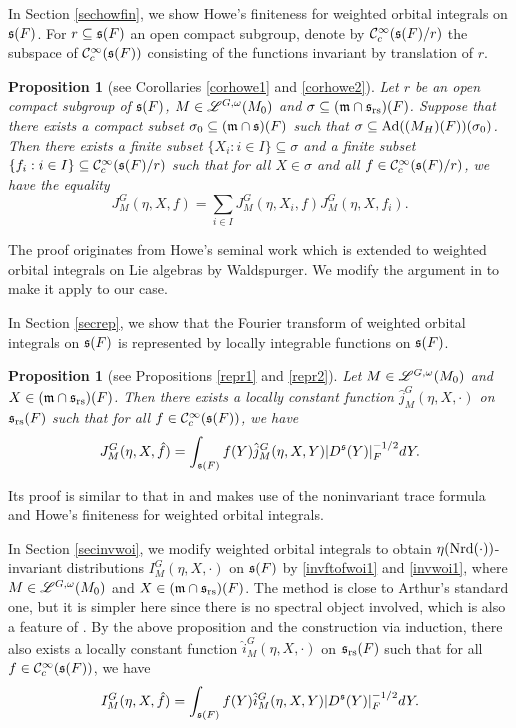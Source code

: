 \documentclass[a4paper]{amsart}
\newcommand{\fm}{{\mathfrak{m}}} \newcommand{\fn}{{\mathfrak{n}}}\newcommand{\fo}{{\mathfrak{o}}} \newcommand{\fp}{{\mathfrak{p}}}
\newtheorem{prop}[thm]{Proposition}
\theoremstyle{definition}
\theoremstyle{remark}
\numberwithin{equation}{subsection}
\begin{document}
In Section \ref{sechowfin}, we show Howe's finiteness for weighted orbital integrals on ${\mathfrak{s}}(F)$. For $r\subseteq{\mathfrak{s}}(F)$ an open compact subgroup, denote by ${\mathcal {C}}_c^\infty({\mathfrak{s}}(F)/r)$ the subspace of ${\mathcal {C}}_c^\infty({\mathfrak{s}}(F))$ consisting of the functions invariant by translation of $r$. 

\begin{prop}[see Corollaries \ref{corhowe1} and \ref{corhowe2}]
Let $r$ be an open compact subgroup of ${\mathfrak{s}}(F)$, $M\in\mathscr{L}^{G,\omega}(M_0)$ and $\sigma\subseteq (\fm\cap\fs_\rs)(F)$. Suppose that there exists a compact subset $\sigma_0\subseteq(\fm\cap\fs)(F)$ such that $\sigma\subseteq {\mathrm{Ad}}((M_H)(F))(\sigma_0)$. Then there exists a finite subset $\{X_i: i\in I\}\subseteq\sigma$ and a finite subset $\{f_i: i\in I\}\subseteq{\mathcal {C}}_c^\infty({\mathfrak{s}}(F)/r)$ such that for all $X\in\sigma$ and all $f\in{\mathcal {C}}_c^\infty({\mathfrak{s}}(F)/r)$, we have the equality
$$ J_M^G(\eta, X, f)=\sum_{i\in I} J_M^G(\eta, X_i, f) J_M^G(\eta, X, f_i). $$
\end{prop}

The proof originates from Howe's seminal work \cite{MR342645} which is extended to weighted orbital integrals on Lie algebras by Waldspurger. We modify the argument in \cite[\S IV]{MR1344131} to make it apply to our case. 

In Section \ref{secrep}, we show that the Fourier transform of weighted orbital integrals on ${\mathfrak{s}}(F)$ is represented by locally integrable functions on ${\mathfrak{s}}(F)$. 

\begin{prop}[see Propositions \ref{repr1} and \ref{repr2}]
Let $M\in\mathscr{L}^{G,\omega}(M_0)$ and $X\in(\fm\cap\fs_\rs)(F)$. Then there exists a locally constant function $\hat{j}_M^G(\eta, X,\cdot)$ on ${\mathfrak{s}}_{\mathrm{rs}}(F)$ such that for all $f\in{\mathcal {C}}_c^\infty({\mathfrak{s}}(F))$, we have 
$$ J_M^G(\eta, X, \hat{f})=\int_{{\mathfrak{s}}(F)} f(Y)\hat{j}_M^G(\eta, X,Y)|D^{\mathfrak{s}}(Y)|_F^{-1/2}dY. $$
\end{prop}

Its proof is similar to that in \cite[\S V]{MR1344131} and makes use of the noninvariant trace formula and Howe's finiteness for weighted orbital integrals. 

In Section \ref{secinvwoi}, we modify weighted orbital integrals to obtain $\eta({\mathrm{Nrd}}(\cdot))$-invariant distributions $I_M^G(\eta, X, \cdot)$ on ${\mathfrak{s}}(F)$ by \eqref{invftofwoi1} and \eqref{invwoi1}, where $M\in\mathscr{L}^{G,\omega}(M_0)$ and $X\in(\fm\cap\fs_\rs)(F)$. The method is close to Arthur's standard one, but it is simpler here since there is no spectral object involved, which is also a feature of \cite{MR1344131}. By the above proposition and the construction via induction, there also exists a locally constant function $\hat{i}_M^G(\eta, X,\cdot)$ on ${\mathfrak{s}}_{\mathrm{rs}}(F)$ such that for all $f\in{\mathcal {C}}_c^\infty({\mathfrak{s}}(F))$, we have 
$$ I_M^G(\eta, X, \hat{f})=\int_{{\mathfrak{s}}(F)} f(Y)\hat{i}_M^G(\eta, X,Y)|D^{\mathfrak{s}}(Y)|_F^{-1/2}dY. $$
\end{document}
